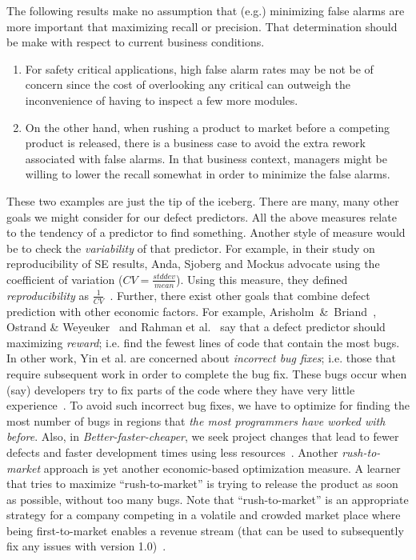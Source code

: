 \documentclass{sig-alternative}
\newcommand{\be}{\begin{enumerate}}
\newcommand{\ee}{\end{enumerate}}
\begin{document}
The following results make no assumption that (e.g.) minimizing false alarms are 
more important that maximizing recall or precision. That determination 
should be make with respect to current business conditions. 
\be
\item
For safety critical applications, high false alarm rates may be not be of concern since the cost
of overlooking any critical can outweigh the inconvenience of having to inspect a few more
modules. 
\item
On the other hand, when rushing a product to market before a competing product is released, there is a business case to 
avoid the extra rework associated with false alarms.  In that business context, 
managers might be willing to lower the recall somewhat in order to minimize the false alarms.
\ee
These two examples are just the tip of the iceberg. There are many, many other goals we might consider
for our defect predictors.
All the above measures relate to the tendency of a predictor to find something. Another style
of measure would be to check the {\em variability} of that predictor.
For example,
in their study on reproducibility of SE results,
 Anda, Sjoberg and Mockus advocate using the coefficient of variation ($CV=\frac{stddev}{mean}$).
Using this measure, they defined {\em reproducibility} as $\frac{1}{CV}$~\cite{anda09}.
Further, 
there exist other goals that combine defect prediction with other economic
factors.
For example, Arisholm~\&~Briand~\cite{arisholm06},  Ostrand \& Weyeuker~\cite{ostrand04} and Rahman et al.~\cite{rahman12}
say that a defect predictor should maximizing {\em reward}; i.e. find the fewest lines of code
that contain the most bugs.
In other work, Yin et al. are concerned about
 {\em incorrect bug fixes}; i.e. those that require subsequent work in order to complete the bug fix.
These bugs occur  when (say) developers try to fix parts of the code
where they have very little experience~\cite{yin11}.  To avoid such incorrect bug fixes, we have to optimize
for finding the most number of bugs in regions that {\em the most programmers have worked with before}.
Also, in {\em Better-faster-cheaper}, we seek  project changes that lead
to fewer defects and faster development times using less resources~\cite{Green,elrawas08,elrawas10,me07f,me09a,me09f}.
Another  {\em  rush-to-market} approach is yet another economic-based optimization measure.
A learner that tries to maximize ``rush-to-market'' is trying to release the product as soon
as possible, without too many bugs. Note that ``rush-to-market'' is an appropriate strategy for a company competing
in a volatile and crowded market place where being first-to-market enables a revenue stream (that can be
used to subsequently fix any issues with version 1.0)~\cite{huang06}.
\end{document}
